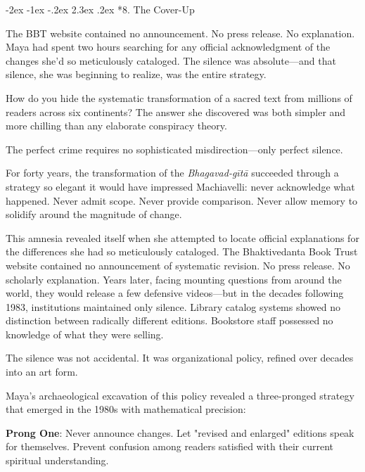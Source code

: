 \documentclass[12pt,twoside]{book}
\makeatletter
\renewcommand\section{\@startsection{section}{1}{\z@}%
{-3.5ex \@plus -1ex \@minus -.2ex}%
{2.3ex \@plus.2ex}%
{\normalfont\Large\bfseries}}
\let\oldsection\section
\renewcommand{\section}[1]{\needspace{4\baselineskip}\oldsection{#1}}
\def\cleardoublepage{\clearpage\if@twoside \ifodd\c@page\else\hbox{}\thispagestyle{empty}\newpage\if@twocolumn\hbox{}\newpage\fi\fi\fi}
\renewcommand\section{\@startsection{section}{1}{\z@}%
{-2ex \@plus -1ex \@minus -.2ex}%
{2.3ex \@plus.2ex}%
{\normalfont\Large\bfseries}}
\makeatother
\begin{document}
\cleardoublepage
\vspace*{0.20\textheight}
\section*{8. The Cover-Up}
\thispagestyle{chapterpage}

\normalfont\justifying
The BBT website contained no announcement. No press release. No explanation. Maya had spent two hours searching for any official acknowledgment of the changes she'd so meticulously cataloged. The silence was absolute—and that silence, she was beginning to realize, was the entire strategy.

How do you hide the systematic transformation of a sacred text from millions of readers across six continents? The answer she discovered was both simpler and more chilling than any elaborate conspiracy theory.

The perfect crime requires no sophisticated misdirection—only perfect silence.

For forty years, the transformation of the \emph{Bhagavad-gītā} succeeded through a strategy so elegant it would have impressed Machiavelli: never acknowledge what happened. Never admit scope. Never provide comparison. Never allow memory to solidify around the magnitude of change.

This amnesia revealed itself when she attempted to locate official explanations for the differences she had so meticulously cataloged. The Bhaktivedanta Book Trust website contained no announcement of systematic revision. No press release. No scholarly explanation. Years later, facing mounting questions from around the world, they would release a few defensive videos—but in the decades following 1983, institutions maintained only silence. Library catalog systems showed no distinction between radically different editions. Bookstore staff possessed no knowledge of what they were selling.

The silence was not accidental. It was organizational policy, refined over decades into an art form.

Maya's archaeological excavation of this policy revealed a three-pronged strategy that emerged in the 1980s with mathematical precision:

\textbf{\textbf{Prong One}}: Never announce changes. Let "revised and enlarged" editions speak for themselves. Prevent confusion among readers satisfied with their current spiritual understanding.
\end{document}
